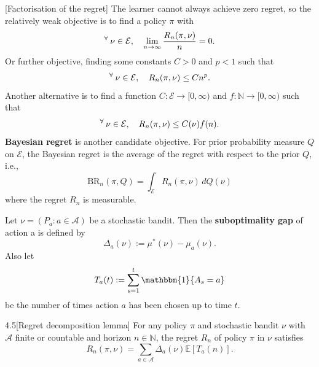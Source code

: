 \documentclass[10pt]{article}
\newenvironment{lemma*}[1]{%
  \IfBlankTF{#1}
    {\renewcommand{\themanuallemmainner}{\unskip}}
    {\renewcommand\themanuallemmainner{#1}}%
  \manuallemmainner
}{\endmanuallemmainner}
\theoremstyle{definition}
\newenvironment{definition*}[1]{%
  \IfBlankTF{#1}
    {\renewcommand{\themanualdefinitioninner}{\unskip}}
    {\renewcommand\themanualdefinitioninner{#1}}%
  \manualdefinitioninner
}{\endmanualdefinitioninner}
\newenvironment{remark*}[1]{%
  \IfBlankTF{#1}
    {\renewcommand{\themanualremarkinner}{\unskip}}
    {\renewcommand\themanualremarkinner{#1}}%
  \manualremarkinner
}{\endmanualremarkinner}
\begin{document}
\begin{remark*}{}[Factorisation of the regret]
    The learner cannot always achieve zero regret, so the relatively weak objective is to find a policy $\pi$ with
    \begin{equation*}
        ^\forall \hspace{0.2em} \nu \in \mathcal{E}, \hspace{1em} \lim_{n \to \infty} \frac{R_n(\pi, \nu)}{n} = 0.
    \end{equation*}
    Or further objective, finding some constants $C > 0$ and $p < 1$ such that
    \begin{equation*} 
        ^\forall \hspace{0.2em} \nu \in \mathcal{E}, \hspace{1em} R_n(\pi, \nu) \leq C n^p.
    \end{equation*}
    Another alternative is to find a function $C: \mathcal{E} \to [0, \infty)$ and $f : \mathbb{N} \to [0, \infty)$ such that
    \begin{equation*}
        ^\forall \hspace{0.2em} \nu \in \mathcal{E}, \hspace{1em} R_n(\pi, \nu) \leq C(\nu) f(n).
    \end{equation*}
    \textbf{Bayesian regret} is another candidate objective. For prior probability measure $Q$ on $\mathcal{E}$, 
    the Bayesian regret is the average of the regret with respect to the prior $Q$, i.e.,
    \begin{equation*}
        \text{BR}_n(\pi, Q) = \int_{\mathcal{E}} R_n(\pi, \nu) \, dQ(\nu)
    \end{equation*}
    where the regret $R_n$ is measurable.
\end{remark*}

\begin{definition*}{}
    Let $\nu = \left( P_a : a \in \mathcal{A} \right)$ be a stochastic bandit.
    Then the \textbf{suboptimality gap} of action a is defined by
    \begin{equation*}
        \Delta_a(\nu) := \mu^*(\nu) - \mu_a(\nu).
    \end{equation*}
    Also let
    \begin{equation*}
        T_a(t) := \sum_{s=1}^t \mathbbm{1}\{A_s = a\}
    \end{equation*}
    be the number of times action $a$ has been chosen up to time $t$.
\end{definition*}

\begin{lemma*}{4.5}[Regret decomposition lemma]
    For any policy $\pi$ and stochastic bandit $\nu$ with $\mathcal{A}$ finite or countable and horizon $n \in \mathbb{N}$, the regret $R_n$ of policy $\pi$ in $\nu$ satisfies
    \begin{equation*}
        R_n(\pi, \nu) = \sum_{a \in \mathcal{A}} \Delta_a(\nu) \mathbb{E}[T_a(n)].
    \end{equation*}
\end{lemma*}
\end{document}
